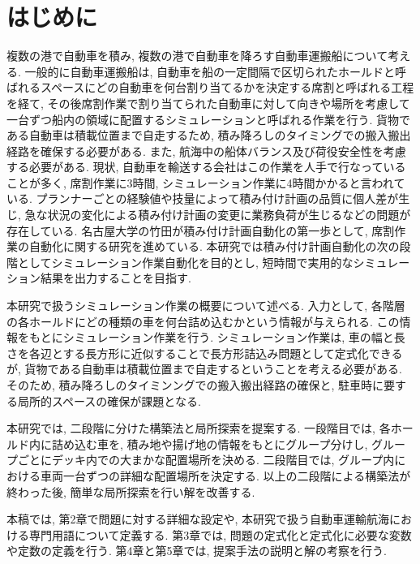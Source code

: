 \chapter{はじめに}

複数の港で自動車を積み, 複数の港で自動車を降ろす自動車運搬船について考える. 
一般的に自動車運搬船は, 自動車を船の一定間隔で区切られたホールドと呼ばれるスペースにどの自動車を何台割り当てるかを決定する席割と呼ばれる工程を経て, 
その後席割作業で割り当てられた自動車に対して向きや場所を考慮して一台ずつ船内の領域に配置するシミュレーションと呼ばれる作業を行う. 
貨物である自動車は積載位置まで自走するため, 積み降ろしのタイミングでの搬入搬出経路を確保する必要がある. 
また, 航海中の船体バランス及び荷役安全性を考慮する必要がある. 
現状, 自動車を輸送する会社はこの作業を人手で行なっていることが多く, 席割作業に3時間, シミュレーション作業に4時間かかると言われている\cite{mitsui}. 
プランナーごとの経験値や技量によって積み付け計画の品質に個人差が生じ, 急な状況の変化による積み付け計画の変更に業務負荷が生じるなどの問題が存在している. 
名古屋大学の竹田が積み付け計画自動化の第一歩として, 席割作業の自動化に関する研究を進めている\cite{takeda}. 
本研究では積み付け計画自動化の次の段階としてシミュレーション作業自動化を目的とし, 短時間で実用的なシミュレーション結果を出力することを目指す.  

本研究で扱うシミュレーション作業の概要について述べる. 
入力として, 各階層の各ホールドにどの種類の車を何台詰め込むかという情報が与えられる. 
この情報をもとにシミュレーション作業を行う. 
シミュレーション作業は, 車の幅と長さを各辺とする長方形に近似することで長方形詰込み問題として定式化できるが, 貨物である自動車は積載位置まで自走するということを考える必要がある. 
そのため, 積み降ろしのタイミンングでの搬入搬出経路の確保と, 駐車時に要する局所的スペースの確保が課題となる. 

本研究では, 二段階に分けた構築法と局所探索を提案する. 
一段階目では, 各ホールド内に詰め込む車を, 積み地や揚げ地の情報をもとにグループ分けし, グループごとにデッキ内での大まかな配置場所を決める. 
二段階目では, グループ内における車両一台ずつの詳細な配置場所を決定する. 
以上の二段階による構築法が終わった後, 簡単な局所探索を行い解を改善する. 

本稿では, 第2章で問題に対する詳細な設定や, 本研究で扱う自動車運輸航海における専門用語について定義する. 
第3章では, 問題の定式化と定式化に必要な変数や定数の定義を行う. 
第4章と第5章では, 提案手法の説明と解の考察を行う. 


